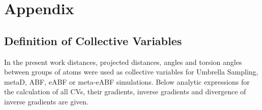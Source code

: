 \chapter{Appendix}
\label{cha:appendix}

\section{Definition of Collective Variables}
\label{sec:reaction coordinates}

In the present work distances, projected distances, angles and torsion angles between groups of atoms were used as collective variables for Umbrella Sampling, metaD, ABF, eABF or meta-eABF simulations.
Below analytic expressions for the calculation of all CVs, their gradients, inverse gradients and divergence of inverse gradients are given.

